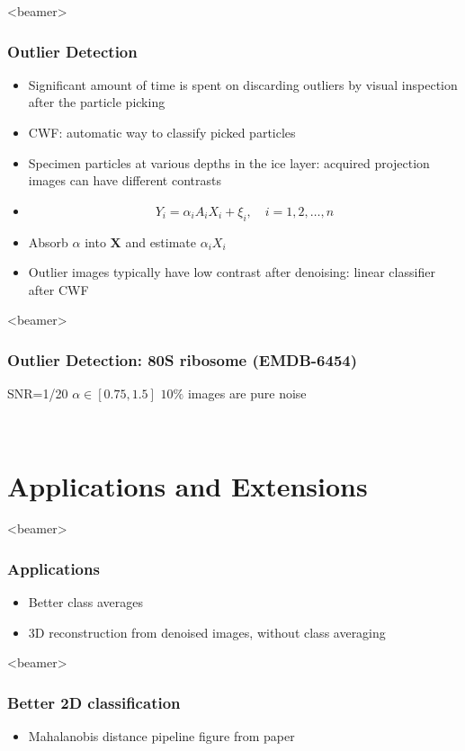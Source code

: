 \documentclass{beamer}
\begin{document}
\begin{frame}<beamer>
\frametitle{Outlier Detection}
\begin{itemize}[<+->]
 \item  Significant amount of time is spent on discarding outliers by visual inspection
after the particle picking 
\item CWF:  automatic way to classify picked particles
\item Specimen particles at various depths in the ice layer: acquired
projection images can have different contrasts
\item 
\begin{equation}
 Y_i = \alpha_i A_i X_i + \xi_i, \quad i=1,2,\ldots,n
\label{eqn:contrast}
\end{equation}
\item Absorb $\alpha$ into $\textbf{X}$ and estimate $\alpha_i X_i$ 
\item  Outlier images typically have low contrast
after denoising: linear classifier
after CWF 
\end{itemize}
\end{frame}

\begin{frame}<beamer>
\frametitle{Outlier Detection: 80S ribosome (EMDB-6454)}
SNR=1/20 
$\alpha \in [0.75,1.5]$
$10\%$ images are pure noise
\begin{figure}[]
\centering
{}
\quad
{} \\
\quad
{}
\end{figure}
\end{frame}

\section{Applications and Extensions}
\begin{frame}<beamer>
\frametitle{Applications}
\begin{itemize}[<+->]
 \item Better class averages
 \item 3D reconstruction from denoised images, without class averaging
\end{itemize}
\end{frame}

\begin{frame}<beamer>
\frametitle{Better 2D classification}
\begin{itemize}[<+->]
 \item Mahalanobis distance pipeline figure from paper
\end{itemize}
\end{frame}
\end{document}
